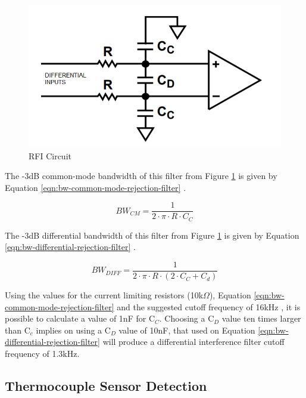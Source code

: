 		\begin{figure}[htbp]
			\centering
				\includegraphics[scale=1.1]{figuras/fig-rfi-standard-filter}
			\caption{RFI Circuit \cite{rfi-standard-filter}}
			\label{fig:rfi-standard-filter}
		\end{figure}

	The -3dB common-mode bandwidth of this filter from Figure \ref{fig:rfi-standard-filter} is given by Equation \ref{eqn:bw-common-mode-rejection-filter} \cite{analogDevDesignersGuide}.

		\begin{equation}\label{eqn:bw-common-mode-rejection-filter}
			BW_{CM}=\frac{1}{2 \cdot \pi \cdot R \cdot C_{C}}
		\end{equation}
	
	The -3dB differential bandwidth of this filter from Figure \ref{fig:rfi-standard-filter} is given by Equation \ref{eqn:bw-differential-rejection-filter} \cite{analogDevDesignersGuide}.
	
		\begin{equation}\label{eqn:bw-differential-rejection-filter}
			BW_{DIFF}=\frac{1}{2 \cdot \pi \cdot R \cdot \left( 2 \cdot C_{C} + C_{d} \right)}
		\end{equation}
		
	Using the values for the current limiting resistors (10k$\Omega$), Equation \ref{eqn:bw-common-mode-rejection-filter} and the suggested cutoff frequency of 16kHz \cite{two-ways-thermocouple}, it is possible to calculate a value of 1nF for C$_{C}$. Choosing a C$_{D}$ value ten times larger than C$_{c}$ implies on using a C$_{D}$ value of 10nF, that used on Equation \ref{eqn:bw-differential-rejection-filter} will produce a differential interference filter cutoff frequency of 1.3kHz.
		
	\subsection{Thermocouple Sensor Detection}
		
